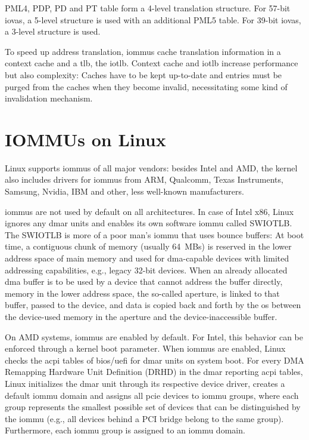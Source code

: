 PML4, PDP, PD and PT table form a 4-level translation structure. For 57-bit
\acp{iova}, a 5-level structure is used with an additional PML5 table. For
39-bit \acp{iova}, a 3-level structure is used.

To speed up address translation, \acp{iommu} cache translation information in a
context cache and a \ac{tlb}, the \ac{iotlb}. Context cache and \ac{iotlb}
increase performance but also complexity: Caches have to be kept up-to-date and
entries must be purged from the caches when they become invalid, necessitating
some kind of invalidation mechanism.


\section{IOMMUs on Linux}
\label{sec:iommus_on_linux}

Linux supports \acp{iommu} of all major vendors: besides Intel and AMD, the
kernel also includes drivers for \acp{iommu} from ARM, Qualcomm, Texas
Instruments, Samsung, Nvidia, IBM and other, less well-known manufacturers.

\acp{iommu} are not used by default on all architectures. In case of Intel x86,
Linux ignores any \ac{dmar} units and enables its own software \ac{iommu} called
SWIOTLB. The SWIOTLB is more of a poor man's \ac{iommu} that uses bounce
buffers: At boot time, a contiguous chunk of memory (usually 64~MBs) is reserved
in the lower address space of main memory and used for \ac{dma}-capable devices
with limited addressing capabilities, e.g., legacy 32-bit devices. When an
already allocated \ac{dma} buffer is to be used by a device that cannot address
the buffer directly, memory in the lower address space, the so-called aperture,
is linked to that buffer, passed to the device, and data is copied back and
forth by the \ac{os} between the device-used memory in the aperture and the
device-inaccessible buffer.

On AMD systems, \acp{iommu} are enabled by default. For Intel, this behavior can
be enforced through a kernel boot parameter. When \acp{iommu} are enabled, Linux
checks the \acs{acpi} tables of \ac{bios}/\ac{uefi} for \ac{dmar} units on
system boot. For every DMA Remapping Hardware Unit Definition (DRHD) in the
\ac{dmar} reporting \ac{acpi} tables, Linux initializes the \ac{dmar} unit
through its respective device driver, creates a default \ac{iommu} domain and
assigns all \ac{pcie} devices to \ac{iommu} groups, where each group represents
the smallest possible set of devices that can be distinguished by the \ac{iommu}
(e.g., all devices behind a PCI bridge belong to the same group). Furthermore,
each \ac{iommu} group is assigned to an \ac{iommu} domain.

